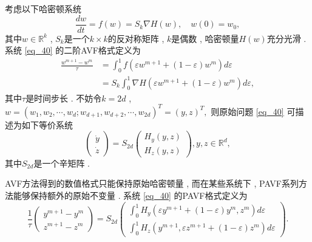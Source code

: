 
考虑以下哈密顿系统
\begin{equation}
\frac{d w}{d t}=f(w)=S_{k} \nabla H(w) , \quad w(0)=w_{0} , 
\label{eq_40}\end{equation}
其中$w \in \mathbb{R}^{k}$ , $S_{k}$是一个$k \times k$的反对称矩阵 , $k$是偶数 , 哈密顿量$H(w)$充分光滑 . 
系统 \eqref{eq_40} 的二阶AVF格式定义为
\begin{equation}
\begin{aligned}
\frac{w^{m+1}-w^{m}}{\tau} &=\int_{0}^{1} f\left(\varepsilon w^{m+1}+(1-\varepsilon) w^{m}\right) d \varepsilon \\
&=S_{k} \int_{0}^{1} \nabla H\left(\varepsilon w^{m+1}+(1-\varepsilon) w^{m}\right) d \varepsilon , 
\end{aligned}
\label{eq_41}\end{equation}
其中$\tau$是时间步长 . 
不妨令$k=2d$ , $w=\left(w_{1} , w_{2} , \cdots , w_{d} ; w_{d+1} , w_{d+2} , \cdots , w_{2d}\right)^{T}=(y , z)^{T},$  则原始问题 \eqref{eq_40} 可描述为如下等价系统
\begin{equation}
\left(\begin{array}{l}
\dot{y} \\
\dot{z}
\end{array}\right)=S_{2 d}\left(\begin{array}{c}
H_{y}(y , z) \\
H_{z}(y , z)
\end{array}\right) , y , z \in \mathbb{R}^{d} , 
\label{eq_42}\end{equation}
其中$S_{2 d}$是一个辛矩阵 . 

AVF方法得到的数值格式只能保持原始哈密顿量 , 而在某些系统下 , PAVF系列方法能够保持额外的原始不变量 . 
系统 \eqref{eq_40} 的PAVF格式定义为
\begin{equation}
\frac{1}{\tau}\left(\begin{array}{c}
y^{m+1}-y^{m} \\
z^{m+1}-z^{m}
\end{array}\right)=S_{2 d}\left(\begin{array}{c}
\int_{0}^{1} H_{y}\left(\varepsilon y^{m+1}+(1-\varepsilon) y^{m} , z^{m}\right) d \varepsilon \\
\int_{0}^{1} H_{z}\left(y^{m+1} , \varepsilon z^{m+1}+(1-\varepsilon) z^{m}\right) d \varepsilon
\end{array}\right)  . 
\label{eq_43}\end{equation}

